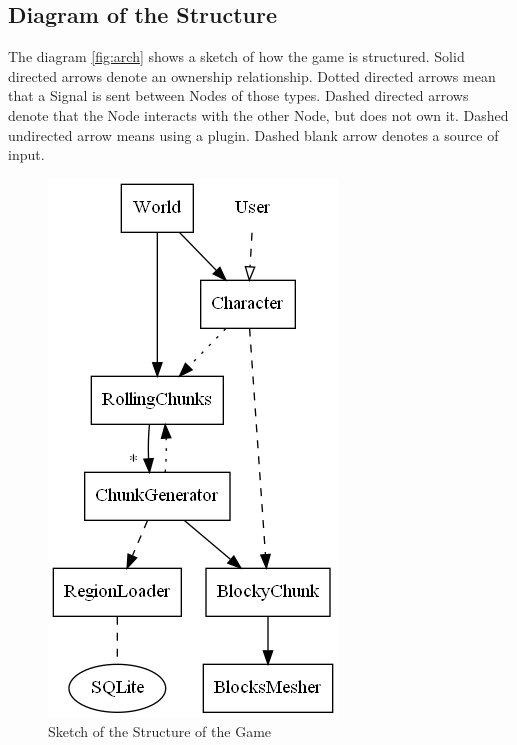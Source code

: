 \documentclass{report}
\begin{document}
\subsection{Diagram of the Structure}
The diagram \autoref{fig:arch} shows a sketch of how the game is structured. Solid directed arrows denote an ownership relationship. Dotted directed arrows mean that a Signal is sent between Nodes of those types. Dashed directed arrows denote that the Node interacts with the other Node, but does not own it. Dashed undirected arrow means using a plugin. Dashed blank arrow denotes a source of input.
\begin{figure}[h]
	\centering
	\includegraphics[scale=0.5]{arch}
	\caption{Sketch of the Structure of the Game}
	\label{fig:arch}
\end{figure}
\end{document}

